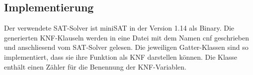 \subsection{Implementierung}
Der verwendete SAT-Solver ist miniSAT in der Version 1.14 als Binary. Die generierten KNF-Klauseln werden in eine Datei mit dem Namen cnf geschrieben und anschliesend vom SAT-Solver gelesen. Die jeweiligen Gatter-Klassen sind so implementiert, dass sie ihre Funktion als KNF darstellen können. Die Klasse  enthält einen Zähler für die Benennung der KNF-Variablen.
